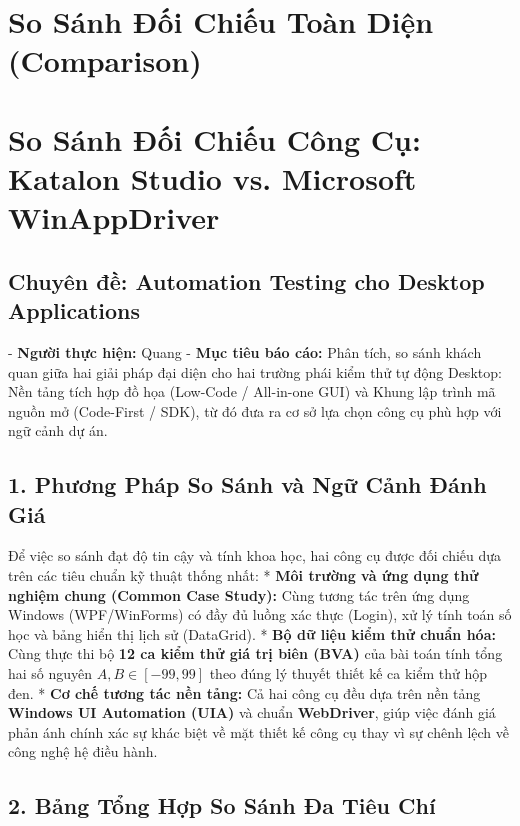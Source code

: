 \section{So Sánh Đối Chiếu Toàn Diện (Comparison)}

\section{So Sánh Đối Chiếu Công Cụ: Katalon Studio vs. Microsoft WinAppDriver}
\subsection{Chuyên đề: Automation Testing cho Desktop Applications}

- \textbf{Người thực hiện:} Quang
- \textbf{Mục tiêu báo cáo:} Phân tích, so sánh khách quan giữa hai giải pháp đại diện cho hai trường phái kiểm thử tự động Desktop: Nền tảng tích hợp đồ họa (Low-Code / All-in-one GUI) và Khung lập trình mã nguồn mở (Code-First / SDK), từ đó đưa ra cơ sở lựa chọn công cụ phù hợp với ngữ cảnh dự án.


\subsection{1. Phương Pháp So Sánh và Ngữ Cảnh Đánh Giá}

Để việc so sánh đạt độ tin cậy và tính khoa học, hai công cụ được đối chiếu dựa trên các tiêu chuẩn kỹ thuật thống nhất:
* \textbf{Môi trường và ứng dụng thử nghiệm chung (Common Case Study):} Cùng tương tác trên ứng dụng Windows (WPF/WinForms) có đầy đủ luồng xác thực (Login), xử lý tính toán số học và bảng hiển thị lịch sử (DataGrid).
* \textbf{Bộ dữ liệu kiểm thử chuẩn hóa:} Cùng thực thi bộ \textbf{12 ca kiểm thử giá trị biên (BVA)} của bài toán tính tổng hai số nguyên $A, B \in [-99, 99]$ theo đúng lý thuyết thiết kế ca kiểm thử hộp đen.
* \textbf{Cơ chế tương tác nền tảng:} Cả hai công cụ đều dựa trên nền tảng \textbf{Windows UI Automation (UIA)} và chuẩn \textbf{WebDriver}, giúp việc đánh giá phản ánh chính xác sự khác biệt về mặt thiết kế công cụ thay vì sự chênh lệch về công nghệ hệ điều hành.


\subsection{2. Bảng Tổng Hợp So Sánh Đa Tiêu Chí}

